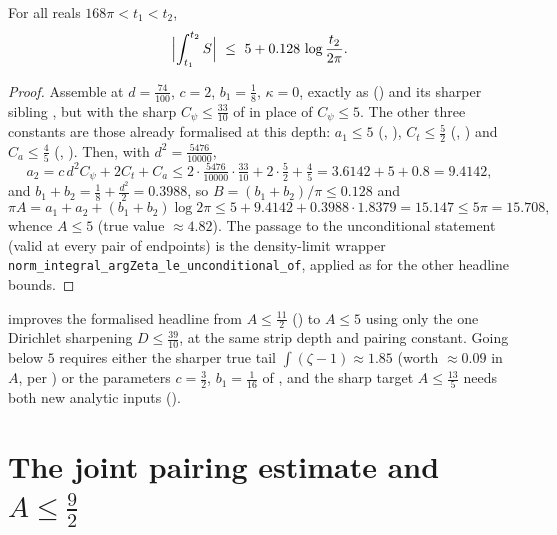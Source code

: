 \begin{theorem}
\label{thm:ls_five}
\leanok
For all reals $168\pi<t_1<t_2$,
\[
  \Bigl|\int_{t_1}^{t_2}S\Bigr|\ \le\ 5+0.128\,\log\frac{t_2}{2\pi}.
\]
\end{theorem}

\begin{proof}
\leanok
Assemble at $d=\tfrac{74}{100}$, $c=2$, $b_1=\tfrac18$, $\kappa=0$, exactly as
 () and
its sharper sibling
, but with the sharp
$C_\psi\le\tfrac{33}{10}$ of  in place of $C_\psi\le5$. The other three
constants are those already formalised at this depth: $a_1\le5$
(, ), $C_t\le\tfrac52$
(, ) and $C_a\le\tfrac45$
(, ). Then, with
$d^2=\tfrac{5476}{10000}$,
\[
  a_2=c\,d^2C_\psi+2C_t+C_a\le2\cdot\tfrac{5476}{10000}\cdot\tfrac{33}{10}+2\cdot\tfrac52+\tfrac45
     =3.6142+5+0.8=9.4142,
\]
and $b_1+b_2=\tfrac18+\tfrac{d^2}2=0.3988$, so $B=(b_1+b_2)/\pi\le0.128$ and
\[
  \pi A=a_1+a_2+(b_1+b_2)\log2\pi\le5+9.4142+0.3988\cdot1.8379=15.147\le5\pi=15.708,
\]
whence $A\le5$ (true value $\approx4.82$). The passage to the unconditional statement (valid
at every pair of endpoints) is the density-limit wrapper
\texttt{norm\_integral\_argZeta\_le\_unconditional\_of}, applied as for the other
headline bounds.
\end{proof}

\begin{remark}[Scope]
\label{rem:ls_five_scope}
 improves the formalised headline from $A\le\tfrac{11}2$
() to $A\le5$ using only the
one Dirichlet sharpening $D\le\tfrac{39}{10}$, at the same strip depth and pairing
constant. Going below $5$ requires either the sharper true tail $\int(\zeta-1)\approx1.85$
(worth $\approx0.09$ in $A$, per ) or the parameters
$c=\tfrac32$, $b_1=\tfrac1{16}$ of , and the sharp target
$A\le\tfrac{13}5$ needs both new analytic inputs ().
\end{remark}

\section{The joint pairing estimate and \texorpdfstring{$A\le\tfrac92$}{A<=9/2}}
\label{sec:ls_ninehalves}

